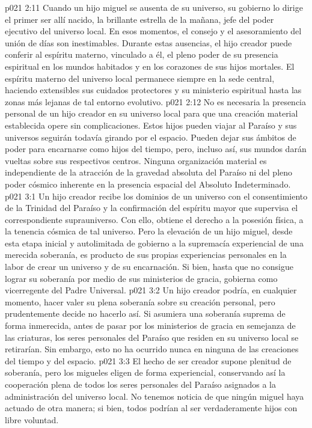 \vs p021 2:11 \pc Cuando un hijo miguel se ausenta de su universo, su gobierno lo dirige el primer ser allí nacido, la brillante estrella de la mañana, jefe del poder ejecutivo del universo local. En esos momentos, el consejo y el asesoramiento del unión de días son inestimables. Durante estas ausencias, el hijo creador puede conferir al espíritu materno, vinculado a él, el pleno poder de su presencia espiritual en los mundos habitados y en los corazones de sus hijos mortales. El espíritu materno del universo local permanece siempre en la sede central, haciendo extensibles sus cuidados protectores y su ministerio espiritual hasta las zonas más lejanas de tal entorno evolutivo.
\vs p021 2:12 No es necesaria la presencia personal de un hijo creador en su universo local para que una creación material establecida opere sin complicaciones. Estos hijos pueden viajar al Paraíso y sus universos seguirán todavía girando por el espacio. Pueden dejar sus ámbitos de poder para encarnarse como hijos del tiempo, pero, incluso así, sus mundos darán vueltas sobre sus respectivos centros. Ninguna organización material es independiente de la atracción de la gravedad absoluta del Paraíso ni del pleno poder cósmico inherente en la presencia espacial del Absoluto Indeterminado.
\vs p021 3:1 Un hijo creador recibe los dominios de un universo con el consentimiento de la Trinidad del Paraíso y la confirmación del espíritu mayor que supervisa el correspondiente suprauniverso. Con ello, obtiene el derecho a la posesión física, a la tenencia cósmica de tal universo. Pero la elevación de un hijo miguel, desde esta etapa inicial y autolimitada de gobierno a la supremacía experiencial de una merecida soberanía, es producto de sus propias experiencias personales en la labor de crear un universo y de su encarnación. Si bien, hasta que no consigue lograr su soberanía por medio de sus ministerios de gracia, gobierna como vicerregente del Padre Universal.
\vs p021 3:2 \pc Un hijo creador podría, en cualquier momento, hacer valer su plena soberanía sobre su creación personal, pero prudentemente decide no hacerlo así. Si asumiera una soberanía suprema de forma inmerecida, antes de pasar por los ministerios de gracia en semejanza de las criaturas, los seres personales del Paraíso que residen en su universo local se retirarían. Sin embargo, esto no ha ocurrido nunca en ninguna de las creaciones del tiempo y del espacio.
\vs p021 3:3 El hecho de ser creador supone plenitud de soberanía, pero los migueles eligen  de forma experiencial, conservando así la cooperación plena de todos los seres personales del Paraíso asignados a la administración del universo local. No tenemos noticia de que ningún miguel haya actuado de otra manera; si bien, todos podrían al ser verdaderamente hijos con libre voluntad.
